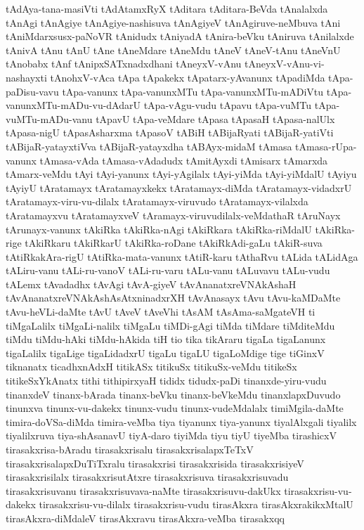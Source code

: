 {tAdAya-tana-masiVti
tAdAtamxRyX
tAditara
tAditara-BeVda
tAnalalxda
tAnAgi
tAnAgiye
tAnAgiye-nashisuva
tAnAgiyeV
tAnAgiruve-neMbuva
tAni
tAniMdarxsusx-paNoVR
tAnidudx
tAniyadA
tAnira-beVku
tAniruva
tAnilalxde
tAnivA
tAnu
tAnU
tAne
tAneMdare
tAneMdu
tAneV
tAneV-tAnu
tAneVnU
tAnobabx
tAnf
tAnipxSATxnadxdhani
tAneyxV-vAnu
tAneyxV-vAnu-vi-nashayxti
tAnohxV-vAca
tApa
tApakekx
tApatarx-yAvanunx
tApadiMda
tApa-paDisu-vavu
tApa-vanunx
tApa-vanunxMTu
tApa-vanunxMTu-mADiVtu
tApa-vanunxMTu-mADu-vu-dAdarU
tApa-vAgu-vudu
tApavu
tApa-vuMTu
tApa-vuMTu-mADu-vanu
tApavU
tApa-veMdare
tApasa
tApasaH
tApasa-nalUlx
tApasa-nigU
tApasAsharxma
tApasoV
tABiH
tABijaRyati
tABijaR-yatiVti
tABijaR-yatayxtiVva
tABijaR-yatayxdha
tABAyx-midaM
tAmasa
tAmasa-rUpa-vanunx
tAmasa-vAda
tAmasa-vAdadudx
tAmitAyxdi
tAmisarx
tAmarxda
tAmarx-veMdu
tAyi
tAyi-yanunx
tAyi-yAgilalx
tAyi-yiMda
tAyi-yiMdalU
tAyiyu
tAyiyU
tAratamayx
tAratamayxkekx
tAratamayx-diMda
tAratamayx-vidadxrU
tAratamayx-viru-vu-dilalx
tAratamayx-viruvudo
tAratamayx-vilalxda
tAratamayxvu
tAratamayxveV
tAramayx-viruvudilalx-veMdathaR
tAruNayx
tArunayx-vanunx
tAkiRka
tAkiRka-nAgi
tAkiRkara
tAkiRka-riMdalU
tAkiRka-rige
tAkiRkaru
tAkiRkarU
tAkiRka-roDane
tAkiRkAdi-gaLu
tAkiR-suva
tAtiRkakAra-rigU
tAtiRka-mata-vanunx
tAtiR-karu
tAthaRvu
tALida
tALidAga
tALiru-vanu
tALi-ru-vanoV
tALi-ru-varu
tALu-vanu
tALuvavu
tALu-vudu
tALemx
tAvadadhx
tAvAgi
tAvA-giyeV
tAvAnanatxreVNAkAshaH
tAvAnanatxreVNAkAshAsAtxninadxrXH
tAvAnasayx
tAvu
tAvu-kaMDaMte
tAvu-heVLi-daMte
tAvU
tAveV
tAveVhi
tAsAM
tAsAma-saMgateVH
ti
tiMgaLalilx
tiMgaLi-nalilx
tiMgaLu
tiMDi-gAgi
tiMda
tiMdare
tiMditeMdu
tiMdu
tiMdu-hAki
tiMdu-hAkida
tiH
tio
tika
tikAraru
tigaLa
tigaLanunx
tigaLalilx
tigaLige
tigaLidadxrU
tigaLu
tigaLU
tigaLoMdige
tige
tiGinxV
tiknanatx
ticadhxnAdxH
titikASx
titikuSx
titikuSx-veMdu
titikeSx
titikeSxYkAnatx
tithi
tithipirxyaH
tididx
tidudx-paDi
tinanxde-yiru-vudu
tinanxdeV
tinanx-bArada
tinanx-beVku
tinanx-beVkeMdu
tinanxlapxDuvudo
tinunxva
tinunx-vu-dakekx
tinunx-vudu
tinunx-vudeMdalalx
timiMgila-daMte
timira-doVSa-diMda
timira-veMba
tiya
tiyanunx
tiya-yanunx
tiyalAlxgali
tiyalilx
tiyalilxruva
tiya-shAsanavU
tiyA-daro
tiyiMda
tiyu
tiyU
tiyeMba
tirashicxV
tirasakxrisa-bAradu
tirasakxrisalu
tirasakxrisalapxTeTxV
tirasakxrisalapxDuTiTxralu
tirasakxrisi
tirasakxrisida
tirasakxrisiyeV
tirasakxrisilalx
tirasakxrisutAtxre
tirasakxrisuva
tirasakxrisuvadu
tirasakxrisuvanu
tirasakxrisuvava-naMte
tirasakxrisuvu-dakUkx
tirasakxrisu-vu-dakekx
tirasakxrisu-vu-dilalx
tirasakxrisu-vudu
tirasAkxra
tirasAkxrakikxMtalU
tirasAkxra-diMdaleV
tirasAkxravu
tirasAkxra-veMba
tirasakxqq
}
